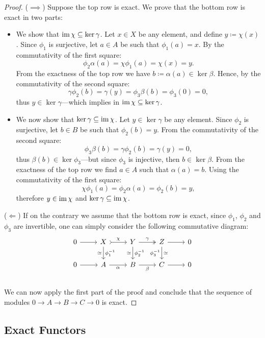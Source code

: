 \begin{proof}
(\(\implies\)) Suppose the top row is exact. We prove that the bottom row is
exact in two parts:
\begin{itemize}\setlength\itemsep{0em}
\item We show that \(\operatorname{im} \chi \subseteq \ker \gamma\). Let \(x \in X\) be any
  element, and define \(y \coloneq \chi(x)\). Since \(\phi_1\) is surjective,
  let \(a \in A\) be such that \(\phi_1(a) = x\). By the commutativity of the
  first square:
  \[
  \phi_2 \alpha(a) = \chi \phi_1(a) = \chi(x) = y.
  \]
  From the exactness of the top row we have \(b \coloneq \alpha(a) \in \ker
  \beta\). Hence, by the commutativity of the second square:
  \[
\gamma \phi_2(b) = \gamma(y) = \phi_3 \beta(b) = \phi_3(0) = 0,
  \]
  thus \(y \in \ker \gamma\)---which implies in \(\operatorname{im} \chi \subseteq \ker
  \gamma\).
\item We now show that \(\ker \gamma \subseteq \operatorname{im} \chi\). Let \(y \in \ker
  \gamma\) be any element. Since \(\phi_2\) is surjective, let \(b \in B\) be
  such that \(\phi_2(b) = y\). From the commutativity of the second square:
  \[
\phi_3 \beta(b) = \gamma \phi_2(b) = \gamma(y) = 0,
  \]
  thus \(\beta(b) \in \ker \phi_3\)---but since \(\phi_3\) is injective, then
  \(b \in \ker \beta\). From the exactness of the top row we find \(a \in A\)
  such that \(\alpha(a) = b\). Using the commutativity of the first square:
  \[
  \chi \phi_1(a) = \phi_2 \alpha(a) = \phi_2(b) = y,
  \]
  therefore \(y \in \operatorname{im} \chi\) and \(\ker \gamma \subseteq \operatorname{im} \chi\).
\end{itemize}

(\(\Leftarrow\)) If on the contrary we assume that the bottom row is exact,
since \(\phi_1\), \(\phi_2\) and \(\phi_3\) are invertible, one can simply
consider the following commutative diagram:
\[
\begin{tikzcd}
0 \ar[r]
&X \ar[r, tail, "\chi"] \ar[d, "\dis"', "\phi_1^{-1}"]
&Y \ar[r, two heads, "\gamma"]  \ar[d, "\dis"', "\phi_2^{-1}"]
&Z \ar[r]           \ar[d, "\dis", "\phi_3^{-1}"']
&0 \\
0 \ar[r]
&A \ar[r, "\alpha"']
&B \ar[r, "\beta"']
&C \ar[r]
&0 \\
\end{tikzcd}
\]
We can now apply the first part of the proof and conclude that the sequence of
modules \(0 \to A \to B \to C \to 0\) is exact.
\end{proof}

\subsection{Exact Functors}

